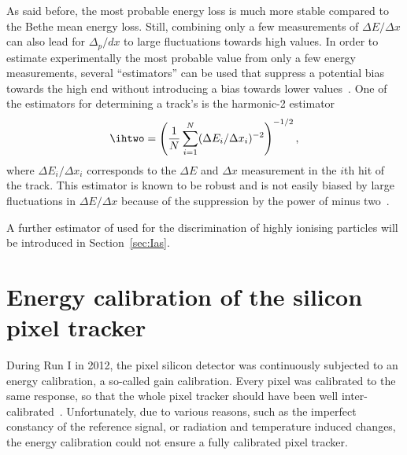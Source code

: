 As said before, the most probable energy loss is much more stable compared to the Bethe mean energy loss.
Still, combining only a few measurements of $\Delta E/\Delta x$ can also lead for $\Delta_p/dx$ to large fluctuations towards high \dedx values.
In order to estimate experimentally the most probable \dedx value from only a few energy measurements, several ``estimators'' can be used that suppress a potential bias towards the high end without introducing a bias towards lower values~\cite{bib:Quertenmont_2010}.
One of the estimators for determining a track's \dedx is the harmonic-2 estimator
\begin{equation}
\ihtwo=\left( \frac{1}{N}\sum_{i=1}^{N}(\Delta E_i/\Delta x_i)^{-2} \right)^{-1/2},
\label{eq:Harmonic2Estimator}
\end{equation}
where $\Delta E_i /\Delta x_i$ corresponds to the $\Delta E$ and $\Delta x$ measurement in the $i$th hit of the track. 
This estimator is known to be robust and is not easily biased by large fluctuations in  $\Delta E/\Delta x$ because of the suppression by the power of minus two~\cite{bib:Quertenmont_2010}.

A further estimator of \dedx used for the discrimination of highly ionising particles will be introduced in Section~\ref{sec:Ias}.


\FloatBarrier
\section{Energy calibration of the silicon pixel tracker}
\label{sec:EnergyCalibration}
During Run I in 2012, the pixel silicon detector was continuously subjected to an energy calibration, a so-called gain calibration.
Every pixel was calibrated to the same response, so that the whole pixel tracker should have been well inter-calibrated~\cite{bib:Danek}.
Unfortunately, due to various reasons, such as the imperfect constancy of the reference signal, or radiation and temperature induced changes, the energy calibration could not ensure a fully calibrated pixel tracker.

